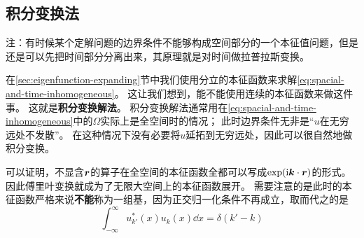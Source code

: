 \documentclass[UTF8]{ctexart}
\newcommand*{\ii}{\mathrm{i}}
\begin{document}
\subsection{积分变换法}

注：有时候某个定解问题的边界条件不能够构成空间部分的一个本征值问题，但是还是可以先把时间部分分离出来，其原理就是对时间做拉普拉斯变换。

在\ref{sec:eigenfunction-expanding}节中我们使用分立的本征函数来求解\eqref{eq:spacial-and-time-inhomogeneous}。
这让我们想到，能不能使用连续的本征函数来做这件事。
这就是\textbf{积分变换解法}。
积分变换解法通常用在\eqref{eq:spacial-and-time-inhomogeneous}中的$\Omega$实际上是全空间时的情况；
此时边界条件无非是“$u$在无穷远处不发散”。
在这种情况下没有必要将$u$延拓到无穷远处，因此可以很自然地做积分变换。

可以证明，不显含$\vb*{r}$的算子在全空间的本征函数全都可以写成$\exp(\ii \vb*{k} \cdot \vb*{r})$的形式。
因此傅里叶变换就成为了无限大空间上的本征函数展开。
需要注意的是此时的本征函数严格来说\textbf{不能}称为一组基，因为正交归一化条件不再成立，取而代之的是
\[
    \int_{-\infty}^\infty u_{k'}^* (x) u_k (x) \dd x = \delta(k' - k)
\]
\end{document}
